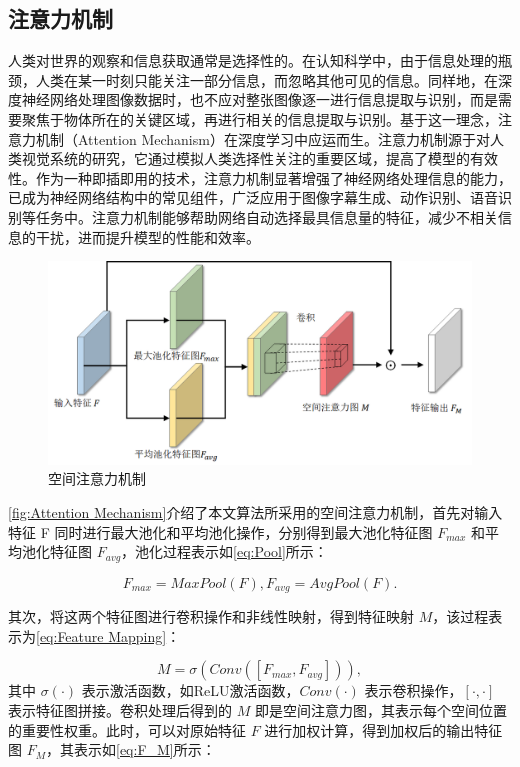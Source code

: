 \documentclass[lang=chs, degree=master, blindreview=false, adobe=false]{yanputhesis}
\begin{document}
\subsection{注意力机制}

人类对世界的观察和信息获取通常是选择性的。在认知科学中，由于信息处理的瓶颈，人类在某一时刻只能关注一部分信息，而忽略其他可见的信息。同样地，在深度神经网络处理图像数据时，也不应对整张图像逐一进行信息提取与识别，而是需要聚焦于物体所在的关键区域，再进行相关的信息提取与识别。基于这一理念，注意力机制（Attention Mechanism）\cite{woo2018cbam}在深度学习中应运而生。注意力机制源于对人类视觉系统的研究，它通过模拟人类选择性关注的重要区域，提高了模型的有效性。作为一种即插即用的技术，注意力机制显著增强了神经网络处理信息的能力，已成为神经网络结构中的常见组件，广泛应用于图像字幕生成、动作识别、语音识别等任务中。注意力机制能够帮助网络自动选择最具信息量的特征，减少不相关信息的干扰，进而提升模型的性能和效率。

\begin{figure}[htb]
	\centering
	\includegraphics[width=0.8\linewidth]{figs/空间注意力机制.png}
	\caption{空间注意力机制}
	\label{fig:Attention Mechanism}
\end{figure}

\autoref{fig:Attention Mechanism}介绍了本文算法所采用的空间注意力机制，首先对输入特征 F 同时进行最大池化和平均池化操作，分别得到最大池化特征图 $F_{max}$  和平均池化特征图 $F_{avg}$，池化过程表示如\autoref{eq:Pool}所示：

\begin{equation}
    \label{eq:Pool}
    F_{max} = MaxPool(F), F_{avg}=AvgPool(F).
\end{equation}

其次，将这两个特征图进行卷积操作和非线性映射，得到特征映射 $M$，该过程表示为\autoref{eq:Feature Mapping}：

\begin{equation}
    \label{eq:Feature Mapping}
    M = \sigma(Conv([F_{max},F_{avg}])),
\end{equation}
\noindent
其中 $\sigma(\cdot)$ 表示激活函数，如ReLU激活函数，$Conv(\cdot)$ 表示卷积操作，$[\cdot,\cdot]$ 表示特征图拼接。卷积处理后得到的 $M$ 即是空间注意力图，其表示每个空间位置的重要性权重。此时，可以对原始特征 $F$ 进行加权计算，得到加权后的输出特征图 $F_M$，其表示如\autoref{eq:F_M}所示：
\end{document}
